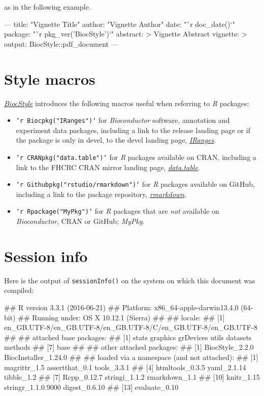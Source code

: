 \documentclass[]{article}
\renewenvironment{verbatim}{\color{codecolor}\begin{myshaded}\begin{oldverbatim}}{\end{oldverbatim}\end{myshaded}}
\begin{document}
as in the following example.

\begin{verbatim}
---
title: "Vignette Title"
author: "Vignette Author"
date: "`r doc_date()`"
package: "`r pkg_ver('BiocStyle')`"
abstract: >
  Vignette Abstract
vignette: >
  %\VignetteIndexEntry{Vignette Title}
  %\VignetteEngine{knitr::rmarkdown}
  %\VignetteEncoding{UTF-8}
output: 
  BiocStyle::pdf_document
---
\end{verbatim}

\section{Style macros}\label{style-macros}

\emph{\href{http://bioconductor.org/packages/BiocStyle}{BiocStyle}}
introduces the following macros useful when referring to \emph{R}
packages:

\begin{itemize}
\item
  \texttt{`r\ Biocpkg("IRanges")`} for \emph{Bioconductor} software,
  annotation and experiment data packages, including a link to the
  release landing page or if the package is only in devel, to the devel
  landing page,
  \emph{\href{http://bioconductor.org/packages/IRanges}{IRanges}}.
\item
  \texttt{`r\ CRANpkg("data.table")`} for \emph{R} packages available on
  CRAN, including a link to the FHCRC CRAN mirror landing page,
  \emph{\href{http://cran.fhcrc.org/web/packages/data.table/index.html}{data.table}}.
\item
  \texttt{`r\ Githubpkg("rstudio/rmarkdown")`} for \emph{R} packages
  available on GitHub, including a link to the package repository,
  \emph{\href{https://github.com/rstudio/rmarkdown}{rmarkdown}}.
\item
  \texttt{`r\ Rpackage("MyPkg")`} for \emph{R} packages that are
  \emph{not} available on \emph{Bioconductor}, CRAN or GitHub;
  \emph{MyPkg}.
\end{itemize}

\section{Session info}\label{session-info}

Here is the output of \texttt{sessionInfo()} on the system on which this
document was compiled:

\begin{verbatim}
## R version 3.3.1 (2016-06-21)
## Platform: x86_64-apple-darwin13.4.0 (64-bit)
## Running under: OS X 10.12.1 (Sierra)
## 
## locale:
## [1] en_GB.UTF-8/en_GB.UTF-8/en_GB.UTF-8/C/en_GB.UTF-8/en_GB.UTF-8
## 
## attached base packages:
## [1] stats     graphics  grDevices utils     datasets  methods  
## [7] base     
## 
## other attached packages:
## [1] BiocStyle_2.2.0      BiocInstaller_1.24.0
## 
## loaded via a namespace (and not attached):
##  [1] magrittr_1.5       assertthat_0.1     tools_3.3.1       
##  [4] htmltools_0.3.5    yaml_2.1.14        tibble_1.2        
##  [7] Rcpp_0.12.7        stringi_1.1.2      rmarkdown_1.1     
## [10] knitr_1.15         stringr_1.1.0.9000 digest_0.6.10     
## [13] evaluate_0.10
\end{verbatim}
\end{document}

